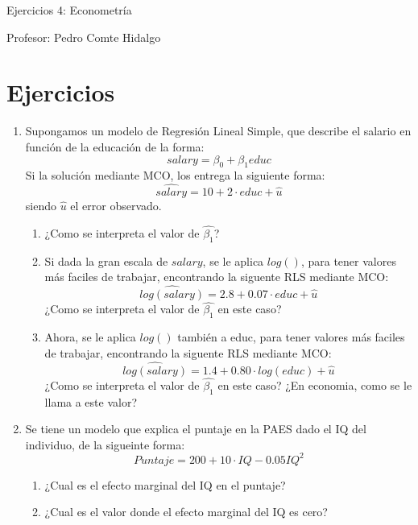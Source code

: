 \documentclass[10pt,a4paper]{article}
\begin{document}
\vspace{5cm}

\begin{center}
    {\Large  Ejercicios 4: Econometría }

Profesor:    Pedro Comte Hidalgo
\end{center}



\section{Ejercicios}
\begin{enumerate}
    \item Supongamos un modelo de Regresión Lineal Simple, que describe el salario en función de la educación de la forma:
    $$salary = \beta_0 + \beta_1 educ$$
    Si la solución mediante MCO, los entrega la siguiente forma:
        $$\hat{salary} = 10 + 2\cdot educ + \hat{u}$$
    siendo $\hat{u}$ el error observado.
    \begin{enumerate}
        \item  ¿Como se interpreta el valor de $\hat{\beta_1}$?  


        \item Si dada la gran escala de $salary$, se le aplica $log()$, para tener valores más faciles de trabajar, encontrando la siguente RLS mediante MCO:
        $$\hat{log({salary})} = 2.8 + 0.07\cdot educ + \hat{u}$$
        ¿Como se interpreta el valor de $\hat{\beta_1}$ en este caso? 
        
        \item Ahora, se le aplica $log()$ también a educ, para tener valores más faciles de trabajar, encontrando la siguente RLS mediante MCO:
        $$\hat{log({salary})} = 1.4 + 0.80\cdot log(educ) + \hat{u}$$
        ¿Como se interpreta el valor de $\hat{\beta_1}$ en este caso? ¿En economia, como se le llama a este valor?
    \end{enumerate}


\item Se tiene un modelo que explica el puntaje en la PAES dado el IQ del individuo, de la sigueinte forma:
$$Puntaje = 200 + 10 \cdot IQ -  0.05IQ^2$$
\begin{enumerate}
    \item ¿Cual es el efecto marginal del IQ en el puntaje?

    \item ¿Cual es el valor donde el efecto marginal del IQ es cero?


\end{enumerate}
\end{enumerate}
\end{document}
